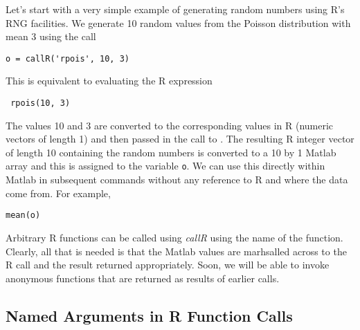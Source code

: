 \documentclass{article}
\def\MatlabFun#1{\textsl{#1}}
\begin{document}
Let's start with a very simple example of generating random numbers
using R's RNG facilities.  We generate 10 random values from the
Poisson distribution with mean 3 using the call
\begin{verbatim}
o = callR('rpois', 10, 3)
\end{verbatim}
This is equivalent to evaluating the R expression
\begin{verbatim}
 rpois(10, 3)
\end{verbatim}
The values 10 and 3 are converted to the corresponding values in R
(numeric vectors of length 1) and then passed in the call to
.  The resulting R integer vector of length 10
containing the random numbers is converted to a 10 by 1 Matlab array
and this is assigned to the variable \texttt{o}.  We can use this
directly within Matlab in subsequent commands without any reference to
R and where the data come from.  For example,
\begin{verbatim}
mean(o)
\end{verbatim}


Arbitrary R functions can be called using \MatlabFun{callR} using the
name of the function.  Clearly, all that is needed is that the Matlab
values are marhsalled across to the R call and the result returned
appropriately.  Soon, we will be able to invoke anonymous functions
that are returned as results of earlier calls.


\subsection{Named Arguments in R Function Calls}
\end{document}
